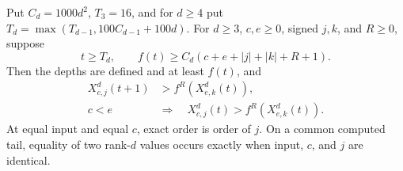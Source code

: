 \documentclass[11pt]{article}
\begin{document}
\begin{lemma}\label{lem:uniform}
Put $C_d=1000d^2$, $T_3=16$, and for $d\ge4$ put
$T_d=\max(T_{d-1},100C_{d-1}+100d)$. For $d\ge3$, $c,e\ge0$, signed
$j,k$, and $R\ge0$, suppose
\begin{equation}\label{eq:region}
 t\ge T_d,\qquad
 f(t)\ge C_d(c+e+|j|+|k|+R+1).
\end{equation}
Then the depths are defined and at least $f(t)$, and
\begin{align*}
 X^d_{c,j}(t+1)&>f^R(X^d_{e,k}(t)),\\
 c<e\quad&\Longrightarrow\quad
 X^d_{c,j}(t)>f^R(X^d_{e,k}(t)).
\end{align*}
At equal input and equal $c$, exact order is order of $j$. On a common
computed tail, equality of two rank-$d$ values occurs exactly when input,
$c$, and $j$ are identical.
\end{lemma}
\end{document}
